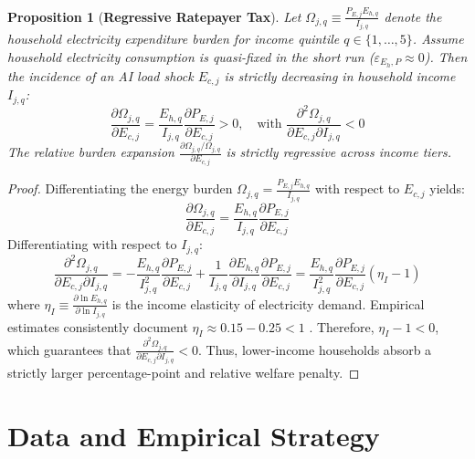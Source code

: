 \documentclass[11pt,a4paper]{article}
\newtheorem{proposition}{Proposition}
\begin{document}
\begin{proposition}[\textbf{Regressive Ratepayer Tax}]\label{prop:regressive}
Let $\Omega_{j,q} \equiv \frac{P_{E,j} E_{h,q}}{I_{j,q}}$ denote the household electricity expenditure burden for income quintile $q \in \{1, \dots, 5\}$. Assume household electricity consumption is quasi-fixed in the short run ($\varepsilon_{E_h, P} \approx 0$). Then the incidence of an AI load shock $E_{c,j}$ is strictly decreasing in household income $I_{j,q}$:
\begin{equation}
    \frac{\partial \Omega_{j,q}}{\partial E_{c,j}} = \frac{E_{h,q}}{I_{j,q}} \frac{\partial P_{E,j}}{\partial E_{c,j}} > 0, \quad \text{with } \frac{\partial^2 \Omega_{j,q}}{\partial E_{c,j} \partial I_{j,q}} < 0
\end{equation}
The relative burden expansion $\frac{\partial \Omega_{j,q} / \Omega_{j,q}}{\partial E_{c,j}}$ is strictly regressive across income tiers.
\end{proposition}

\begin{proof}
Differentiating the energy burden $\Omega_{j,q} = \frac{P_{E,j} E_{h,q}}{I_{j,q}}$ with respect to $E_{c,j}$ yields:
\begin{equation*}
    \frac{\partial \Omega_{j,q}}{\partial E_{c,j}} = \frac{E_{h,q}}{I_{j,q}} \frac{\partial P_{E,j}}{\partial E_{c,j}}
\end{equation*}
Differentiating with respect to $I_{j,q}$:
\begin{equation*}
    \frac{\partial^2 \Omega_{j,q}}{\partial E_{c,j} \partial I_{j,q}} = -\frac{E_{h,q}}{I_{j,q}^2} \frac{\partial P_{E,j}}{\partial E_{c,j}} + \frac{1}{I_{j,q}} \frac{\partial E_{h,q}}{\partial I_{j,q}} \frac{\partial P_{E,j}}{\partial E_{c,j}} = \frac{E_{h,q}}{I_{j,q}^2} \frac{\partial P_{E,j}}{\partial E_{c,j}} (\eta_I - 1)
\end{equation*}
where $\eta_I \equiv \frac{\partial \ln E_{h,q}}{\partial \ln I_{j,q}}$ is the income elasticity of electricity demand. Empirical estimates consistently document $\eta_I \approx 0.15 - 0.25 < 1$ \citep{borenstein2022electricity}. Therefore, $\eta_I - 1 < 0$, which guarantees that $\frac{\partial^2 \Omega_{j,q}}{\partial E_{c,j} \partial I_{j,q}} < 0$. Thus, lower-income households absorb a strictly larger percentage-point and relative welfare penalty.
\end{proof}

\newpage

\section{Data and Empirical Strategy}\label{sec:data}
\end{document}
